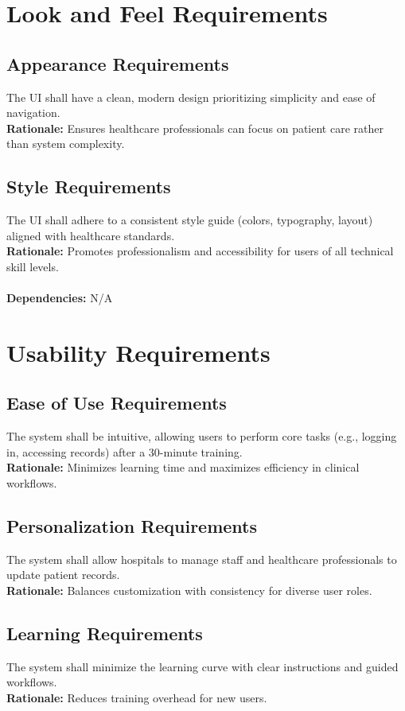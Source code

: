 \documentclass[12pt]{article}
\begin{document}
\begin{itemize}
  \section{Look and Feel Requirements} \label{NFR_LookAndFeel}
\subsection{Appearance Requirements}
The UI shall have a clean, modern design prioritizing simplicity and ease of navigation. \\ 
\textbf{Rationale:} Ensures healthcare professionals can focus on patient care rather than system complexity. 

\subsection{Style Requirements}
The UI shall adhere to a consistent style guide (colors, typography, layout) aligned with healthcare standards. \\ 
\textbf{Rationale:} Promotes professionalism and accessibility for users of all technical skill levels. \\
  \\
\textbf{Dependencies:} N/A

\section{Usability Requirements} \label{NFR_Usability}
\subsection{Ease of Use Requirements}
The system shall be intuitive, allowing users to perform core tasks (e.g., logging in, accessing records) after a 30-minute training.  \\
\textbf{Rationale:} Minimizes learning time and maximizes efficiency in clinical workflows.

\subsection{Personalization Requirements}
The system shall allow hospitals to manage staff and healthcare professionals to update patient records. \\ 
\textbf{Rationale:} Balances customization with consistency for diverse user roles.

\subsection{Learning Requirements}
The system shall minimize the learning curve with clear instructions and guided workflows.  \\
\textbf{Rationale:} Reduces training overhead for new users.


\end{itemize}
\end{document}
